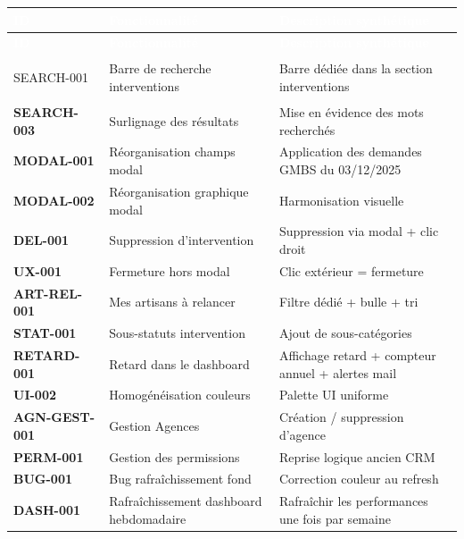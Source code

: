 \documentclass[12pt,a4paper]{article}
\begin{document}
\begin{center}
\renewcommand{\arraystretch}{1.4}
\begin{longtable}{>{\bfseries\small}p{2.5cm} p{4cm} p{7cm}}
    \toprule
    \rowcolor{table-header}
    \textcolor{white}{\textbf{ID}} & \textcolor{white}{\textbf{Fonctionnalité}} & \textcolor{white}{\textbf{Description synthétique}} \\
    \midrule
    \endfirsthead
    
    \toprule
    \rowcolor{table-header}
    \textcolor{white}{\textbf{ID}} & \textcolor{white}{\textbf{Fonctionnalité}} & \textcolor{white}{\textbf{Description synthétique}} \\
    \midrule
    \endhead
    
    \bottomrule
    \endfoot
    
    SEARCH-001 & Barre de recherche interventions & Barre dédiée dans la section interventions \\
    SEARCH-003 & Surlignage des résultats & Mise en évidence des mots recherchés \\
    MODAL-001 & Réorganisation champs modal & Application des demandes GMBS du 03/12/2025 \\
    MODAL-002 & Réorganisation graphique modal & Harmonisation visuelle \\
    DEL-001 & Suppression d'intervention & Suppression via modal + clic droit \\
    UX-001 & Fermeture hors modal & Clic extérieur = fermeture \\
    ART-REL-001 & Mes artisans à relancer & Filtre dédié + bulle + tri \\
    STAT-001 & Sous-statuts intervention & Ajout de sous-catégories \\
    RETARD-001 & Retard dans le dashboard & Affichage retard + compteur annuel + alertes mail \\
    UI-002 & Homogénéisation couleurs & Palette UI uniforme \\
    AGN-GEST-001 & Gestion Agences & Création / suppression d'agence \\
    PERM-001 & Gestion des permissions & Reprise logique ancien CRM \\
    BUG-001 & Bug rafraîchissement fond & Correction couleur au refresh \\
    DASH-001 & Rafraîchissement dashboard hebdomadaire & Rafraîchir les performances une fois par semaine \\
    
\end{longtable}
\end{center}
\end{document}
